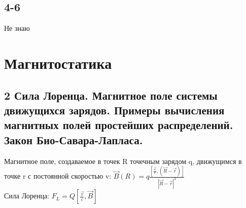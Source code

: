 \documentclass[a4paper,12pt]{article}
\begin{document}
\subsection{4-6}
Не знаю

\section{Магнитостатика}
\subsection{2  Сила Лоренца. Магнитное поле системы движущихся зарядов. Примеры вычисления магнитных полей простейших распределений. Закон Био-Савара-Лапласа.}
Магнитное поле, создаваемое в точек R точечным зарядом q, движущимся в точке r с постоянной скоростью v: $\vec{B}(R) = q \frac{[\frac{\vec{v}}{c} , (\vec{R} - \vec{r})]}{|\vec{R} - \vec{r}|^3}$\\
Сила Лоренца: $F_L = Q \left[ \frac{\vec{v}}{c}, \vec{B} \right]$\\
\end{document}
